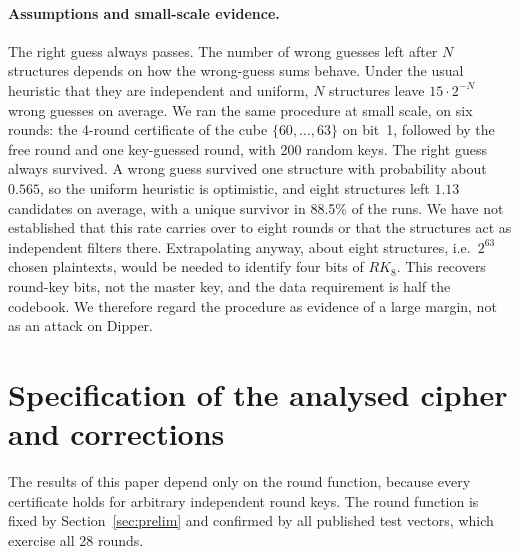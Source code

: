 \documentclass[pdflatex,sn-mathphys-num]{sn-jnl}
\theoremstyle{thmstyleone}
\theoremstyle{thmstylethree}
\theoremstyle{thmstyletwo}
\begin{document}
\paragraph{Assumptions and small-scale evidence.} The right guess always passes. The number of wrong guesses left after $N$ structures depends on how the wrong-guess sums behave. Under the usual heuristic that they are independent and uniform, $N$ structures leave $15\cdot2^{-N}$ wrong guesses on average. We ran the same procedure at small scale, on six rounds: the 4-round certificate of the cube $\{60,\dots,63\}$ on bit~1, followed by the free round and one key-guessed round, with 200 random keys. The right guess always survived. A wrong guess survived one structure with probability about $0.565$, so the uniform heuristic is optimistic, and eight structures left $1.13$ candidates on average, with a unique survivor in 88.5\% of the runs. We have not established that this rate carries over to eight rounds or that the structures act as independent filters there. Extrapolating anyway, about eight structures, i.e.\ $2^{63}$ chosen plaintexts, would be needed to identify four bits of $RK_8$. This recovers round-key bits, not the master key, and the data requirement is half the codebook. We therefore regard the procedure as evidence of a large margin, not as an attack on Dipper.

\section{Specification of the analysed cipher and corrections}\label{sec:erratum}
The results of this paper depend only on the round function, because every certificate holds for arbitrary independent round keys. The round function is fixed by Section~\ref{sec:prelim} and confirmed by all published test vectors, which exercise all 28 rounds.
\end{document}
